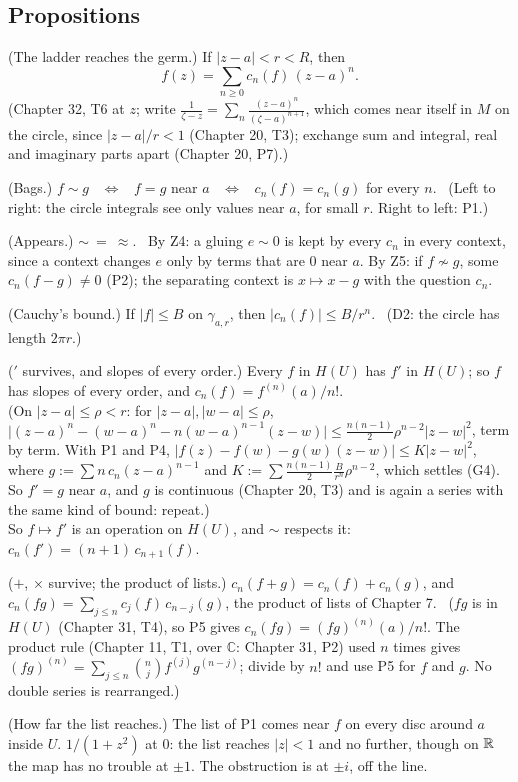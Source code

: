 \subsection*{Propositions}

\begin{lines}
\item[\lab{P1}] (The ladder reaches the germ.) If $|z - a| < r < R$, then \[ f(z) = \sum_{n \ge 0} c_n(f)\, (z - a)^n . \] (Chapter 32, T6 at $z$; write $\frac{1}{\zeta - z} = \sum_n \frac{(z - a)^n}{(\zeta - a)^{n+1}}$, which comes near itself in $M$ on the circle, since $|z - a|/r < 1$ (Chapter 20, T3); exchange sum and integral, real and imaginary parts apart (Chapter 20, P7).)
\item[\lab{P2}] (Bags.) $f \sim g$ \ $\iff$ \ $f = g$ near $a$ \ $\iff$ \ $c_n(f) = c_n(g)$ for every $n$. \ (Left to right: the circle integrals see only values near $a$, for small $r$. Right to left: P1.)
\item[\lab{P3}] (Appears.) $\sim\ =\ \approx$. \ By Z4: a gluing $e \sim 0$ is kept by every $c_n$ in every context, since a context changes $e$ only by terms that are $0$ near $a$. By Z5: if $f \not\sim g$, some $c_n(f - g) \ne 0$ (P2); the separating context is $x \mapsto x - g$ with the question $c_n$.
\item[\lab{P4}] (Cauchy's bound.) If $|f| \le B$ on $\gamma_{a,r}$, then $|c_n(f)| \le B / r^n$. \ (D2: the circle has length $2\pi r$.)
\item[\lab{P5}] ($'$ survives, and slopes of every order.) Every $f$ in $H(U)$ has $f'$ in $H(U)$; so $f$ has slopes of every order, and $c_n(f) = f^{(n)}(a)/n!$. \\
(On $|z - a| \le \rho < r$: for $|z - a|, |w - a| \le \rho$, \ $\bigl|(z - a)^n - (w - a)^n - n (w - a)^{n-1}(z - w)\bigr| \le \tfrac{n(n-1)}{2} \rho^{n-2} |z - w|^2$, term by term. With P1 and P4, $\bigl|f(z) - f(w) - g(w)(z - w)\bigr| \le K |z - w|^2$, where $g := \sum n\,c_n (z - a)^{n-1}$ and $K := \sum \tfrac{n(n-1)}{2} \tfrac{B}{r^n} \rho^{n-2}$, which settles (G4). So $f' = g$ near $a$, and $g$ is continuous (Chapter 20, T3) and is again a series with the same kind of bound: repeat.) \\
So $f \mapsto f'$ is an operation on $H(U)$, and $\sim$ respects it: $c_n(f') = (n + 1)\,c_{n+1}(f)$.
\item[\lab{P6}] ($+$, $\times$ survive; the product of lists.) $c_n(f + g) = c_n(f) + c_n(g)$, and $c_n(f g) = \sum_{j \le n} c_j(f)\, c_{n-j}(g)$, the product of lists of Chapter 7. \ ($fg$ is in $H(U)$ (Chapter 31, T4), so P5 gives $c_n(fg) = (fg)^{(n)}(a)/n!$. The product rule (Chapter 11, T1, over $\mathbb{C}$: Chapter 31, P2) used $n$ times gives $(fg)^{(n)} = \sum_{j \le n} \binom{n}{j} f^{(j)} g^{(n-j)}$; divide by $n!$ and use P5 for $f$ and $g$. No double series is rearranged.)
\item[\lab{P7}] (How far the list reaches.) The list of P1 comes near $f$ on every disc around $a$ inside $U$. $1/(1 + z^2)$ at $0$: the list reaches $|z| < 1$ and no further, though on $\mathbb{R}$ the map has no trouble at $\pm 1$. The obstruction is at $\pm i$, off the line.
\end{lines}

